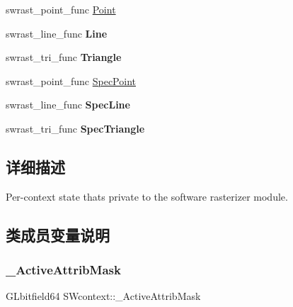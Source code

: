 \textbf{ }\par
\begin{DoxyCompactItemize}
\item 
swrast\+\_\+point\+\_\+func \hyperlink{struct_s_wcontext_ada44d3707a3f96b36294bab7e2a95501}{Point}
\item 
\mbox{\label{struct_s_wcontext_a0315a4d789a026ad5970a1e7f897adec}} 
swrast\+\_\+line\+\_\+func {\bfseries Line}
\item 
\mbox{\label{struct_s_wcontext_ad29561999e2cf593576e20d84cc93eb7}} 
swrast\+\_\+tri\+\_\+func {\bfseries Triangle}
\end{DoxyCompactItemize}

\textbf{ }\par
\begin{DoxyCompactItemize}
\item 
swrast\+\_\+point\+\_\+func \hyperlink{struct_s_wcontext_a47145fa59832830e48e42a33f8a08a69}{Spec\+Point}
\item 
\mbox{\label{struct_s_wcontext_a4fc3dafaa5e85c39510977c0e16331ad}} 
swrast\+\_\+line\+\_\+func {\bfseries Spec\+Line}
\item 
\mbox{\label{struct_s_wcontext_a719509e39338dde37d0249305f5663ac}} 
swrast\+\_\+tri\+\_\+func {\bfseries Spec\+Triangle}
\end{DoxyCompactItemize}



\subsection{详细描述}
Per-\/context state that\textquotesingle{}s private to the software rasterizer module. 

\subsection{类成员变量说明}
\mbox{\label{struct_s_wcontext_adb8d34b28b62e801d44b46484391c89f}} 
\subsubsection{\texorpdfstring{\+\_\+\+Active\+Attrib\+Mask}{\_ActiveAttribMask}}
{\footnotesize\ttfamily G\+Lbitfield64 S\+Wcontext\+::\+\_\+\+Active\+Attrib\+Mask}

